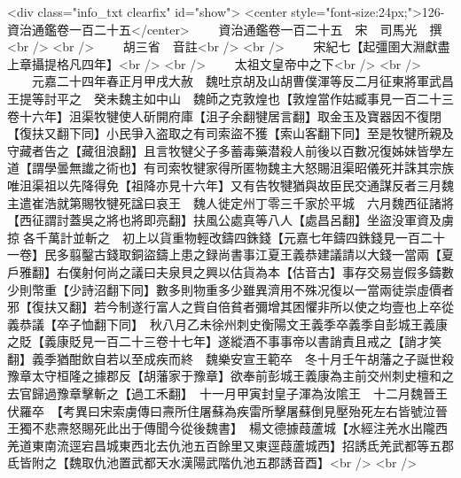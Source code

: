 <div class="info_txt clearfix" id="show">
<center style="font-size:24px;">126-資治通鑑卷一百二十五</center>
  　　資治通鑑卷一百二十五　宋　司馬光　撰<br />
<br />
　　胡三省　音註<br />
<br />
　　宋紀七【起彊圉大淵獻盡上章攝提格凡四年】<br />
<br />
　　太祖文皇帝中之下<br />
<br />
　　元嘉二十四年春正月甲戌大赦　魏吐京胡及山胡曹僕渾等反二月征東將軍武昌王提等討平之　癸未魏主如中山　魏師之克敦煌也【敦煌當作姑臧事見一百二十三卷十六年】沮渠牧犍使人斫開府庫【沮子余翻犍居言翻】取金玉及寶器因不復閉【復扶又翻下同】小民爭入盗取之有司索盜不獲【索山客翻下同】至是牧犍所親及守藏者告之【藏徂浪翻】且言牧犍父子多蓄毒藥潜殺人前後以百數况復姊妹皆學左道【謂學曇無䜟之術也】有司索牧犍家得所匿物魏主大怒賜沮渠昭儀死并誅其宗族唯沮渠祖以先降得免【祖降亦見十六年】又有告牧犍猶與故臣民交通謀反者三月魏主遣崔浩就第賜牧犍死諡曰哀王　魏人徙定州丁零三千家於平城　六月魏西征諸將【西征謂討蓋吳之將也將即亮翻】扶風公處真等八人【處昌呂翻】坐盜没軍資及虜掠各千萬計並斬之　初上以貨重物輕改鑄四銖錢【元嘉七年鑄四銖錢見一百二十一卷】民多翦鑿古錢取銅盜鑄上患之録尚書事江夏王義恭建議請以大錢一當兩【夏戶雅翻】右僕射何尚之議曰夫泉貝之興以估貨為本【估音古】事存交易豈假多鑄數少則幣重【少詩沼翻下同】數多則物重多少雖異濟用不殊况復以一當兩徒崇虛價者邪【復扶又翻】若今制遂行富人之貲自倍貧者彌增其困懼非所以使之均壹也上卒從義恭議【卒子恤翻下同】　秋八月乙未徐州刺史衡陽文王義季卒義季自彭城王義康之貶【義康貶見一百二十三卷十七年】遂縱酒不事事帝以書誚責且戒之【誚才笑翻】義季猶酣飲自若以至成疾而終　魏樂安宣王範卒　冬十月壬午胡藩之子誕世殺豫章太守桓隆之據郡反【胡藩家于豫章】欲奉前彭城王義康為主前交州刺史檀和之去官歸過豫章擊斬之【過工禾翻】　十一月甲寅封皇子渾為汝隂王　十二月魏晉王伏羅卒　【考異曰宋索虜傳曰燾所住屠蘇為疾雷所擊屠蘇倒見壓殆死左右皆號泣晉王獨不悲燾怒賜死此出于傳聞今從後魏書】　楊文德據葭蘆城【水經注羌水出隴西羌道東南流逕宕昌城東西北去仇池五百餘里又東逕葭蘆城西】招誘氐羌武都等五郡氐皆附之【魏取仇池置武都天水漢陽武階仇池五郡誘音酉】<br />
<br />
